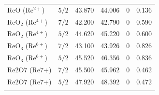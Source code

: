 \documentclass[12pt]{article}
\begin{document}
\begin{table}[H]
\begin{threeparttable}
\begin{tabular}{llrrrr}
$\mathrm{ReO}$ ($\mathrm{Re^{2+}}$) & $5/2$ & 43.870 & 44.006 & 0 & 0.136 \\
$\mathrm{ReO_2}$ ($\mathrm{Re^{4+}}$) & $7/2$ & 42.200 & 42.790 & 0 & 0.590 \\
$\mathrm{ReO_2}$ ($\mathrm{Re^{4+}}$) & $5/2$ & 44.620 & 45.220 & 0 & 0.600 \\
$\mathrm{ReO_3}$ ($\mathrm{Re^{6+}}$) & $7/2$ & 43.100 & 43.926 & 0 & 0.826 \\
$\mathrm{ReO_3}$ ($\mathrm{Re^{6+}}$) & $5/2$ & 45.520 & 46.356 & 0 & 0.836 \\
Re2O7 (Re7+) & $7/2$ & 45.500 & 45.962 & 0 & 0.462 \\
Re2O7 (Re7+) & $5/2$ & 47.920 & 48.392 & 0 & 0.472 \\
\addlinespace
\bottomrule
\end{tabular}
\end{threeparttable}
\end{table}
\end{document}
